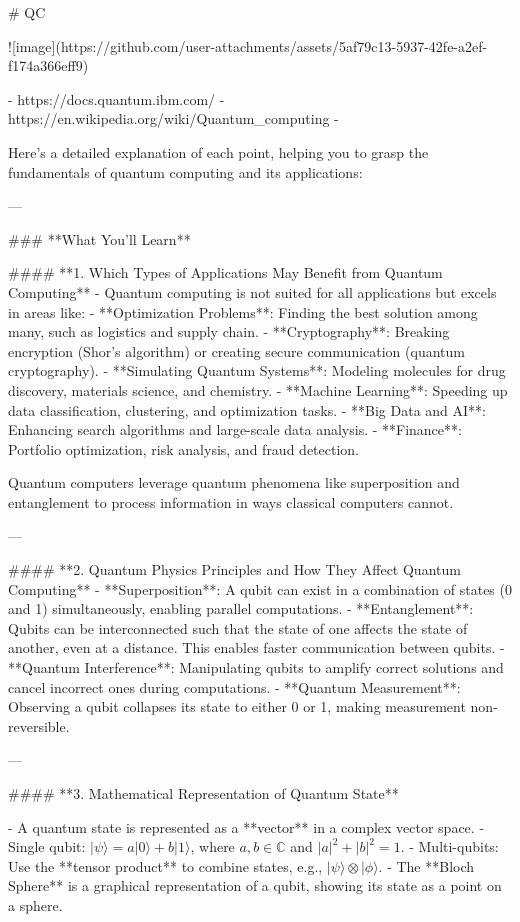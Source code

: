 

# QC

![image](https://github.com/user-attachments/assets/5af79c13-5937-42fe-a2ef-f174a366eff9)


- https://docs.quantum.ibm.com/
- https://en.wikipedia.org/wiki/Quantum_computing
- 




Here’s a detailed explanation of each point, helping you to grasp the fundamentals of quantum computing and its applications:

---

### **What You'll Learn**

#### **1. Which Types of Applications May Benefit from Quantum Computing**
- Quantum computing is not suited for all applications but excels in areas like:
  - **Optimization Problems**: Finding the best solution among many, such as logistics and supply chain.
  - **Cryptography**: Breaking encryption (Shor's algorithm) or creating secure communication (quantum cryptography).
  - **Simulating Quantum Systems**: Modeling molecules for drug discovery, materials science, and chemistry.
  - **Machine Learning**: Speeding up data classification, clustering, and optimization tasks.
  - **Big Data and AI**: Enhancing search algorithms and large-scale data analysis.
  - **Finance**: Portfolio optimization, risk analysis, and fraud detection.
  
  Quantum computers leverage quantum phenomena like superposition and entanglement to process information in ways classical computers cannot.

---

#### **2. Quantum Physics Principles and How They Affect Quantum Computing**
- **Superposition**: A qubit can exist in a combination of states (0 and 1) simultaneously, enabling parallel computations.
- **Entanglement**: Qubits can be interconnected such that the state of one affects the state of another, even at a distance. This enables faster communication between qubits.
- **Quantum Interference**: Manipulating qubits to amplify correct solutions and cancel incorrect ones during computations.
- **Quantum Measurement**: Observing a qubit collapses its state to either 0 or 1, making measurement non-reversible.

---

#### **3. Mathematical Representation of Quantum State**
\usepackage{mathtools}
- A quantum state is represented as a **vector** in a complex vector space.
  - Single qubit: \(|\psi\rangle = a|0\rangle + b|1\rangle\), where \(a, b \in \mathbb{C}\) and \(|a|^2 + |b|^2 = 1\).
  - Multi-qubits: Use the **tensor product** to combine states, e.g., \(|\psi\rangle \otimes |\phi\rangle\).
- The **Bloch Sphere** is a graphical representation of a qubit, showing its state as a point on a sphere.

